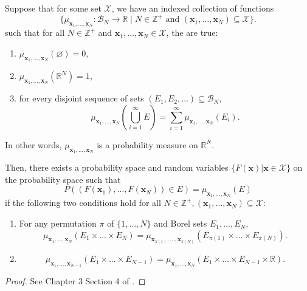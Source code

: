 \begin{theorem}\label{thm:kol-ext}
    Suppose that for some set $\mathcal{X}$, we have an indexed collection of functions
    \begin{equation*}
        \{ \mu_{\mathbf{x}_1, \dots, \mathbf{x}_N} : \mathcal{B}_{N} \to \mathbb{R} \;|\; N \in \mathbb{Z}^{+} \text{ and } (\mathbf{x}_1, \dots, \mathbf{x}_N) \subseteq \mathcal{X}\}.
    \end{equation*}
    such that for all $N \in \mathbb{Z}^{+}$ and $\mathbf{x}_1, \dots, \mathbf{x}_N \in \mathcal{X}$,
    the are true:
    \begin{enumerate}
        \item $\mu_{\mathbf{x}_1, \dots, \mathbf{x}_N}( \varnothing) = 0$,
        \item $\mu_{\mathbf{x}_1, \dots, \mathbf{x}_N}(\mathbb{R}^{N}) = 1$,
        \item for every disjoint sequence of sets $(E_1, E_2, \dots) \subseteq \mathcal{B}_N$,
            \begin{equation*}
                \mu_{\mathbf{x}_1, \dots, \mathbf{x}_N}\left(\bigcup_{i = 1}^{\infty}
                E\right) = \sum_{i = 1}^{\infty}\mu_{\mathbf{x}_1, \dots, \mathbf{x}_N}(E_i).
            \end{equation*}
    \end{enumerate}
    In other words, $\mu_{\mathbf{x}_1, \dots, \mathbf{x}_N}$ is a probability measure on $\mathbb{R}^{N}$.

    Then, there exists a probability space and random variables $\{ F(\mathbf{x}) | \mathbf{x} \in \mathcal{X} \}$
    on the probability space such that
    \begin{equation*}
        P((F(\mathbf{x}_1), \dots, F(\mathbf{x}_N)) \in E) = \mu_{\mathbf{x}_1, \dots, \mathbf{x}_N}(E)
    \end{equation*}
    if the following two conditions hold for all $N \in \mathbb{Z}^{+}, (\mathbf{x}_1, \dots, \mathbf{x}_N) \subseteq \mathcal{X}$:
    \begin{enumerate}
        \item For any permutation $\pi$ of $\{ 1, \dots, N \}$ and Borel sets $E_1, \dots, E_N$,
            \begin{equation*}
                \mu_{\mathbf{x}_1, \dots, \mathbf{x}_N}(E_1 \times \dots \times E_N)
                =\mu_{\mathbf{x}_{\pi(1)}, \dots, \mathbf{x}_{\pi(N)}}\left(E_{\pi(1)} \times \dots \times E_{\pi(N)}\right).
            \end{equation*}
        \item 
            \begin{equation*}
                \mu_{\mathbf{x}_1, \dots, \mathbf{x}_{N - 1}}(E_1 \times \dots \times E_{N - 1})
                =
                \mu_{\mathbf{x}_1, \dots, \mathbf{x}_N}(E_1 \times \dots \times E_{N - 1} \times \mathbb{R}).
            \end{equation*}
    \end{enumerate}
\end{theorem}
\begin{proof}
    See Chapter 3 Section 4 of \cite{kolmogorov1933}.
\end{proof}

